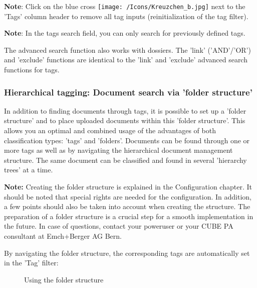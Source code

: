 \textbf{Note}: Click on the blue cross \texttt{[image: /Icons/Kreuzchen\_b.jpg]} next to the 'Tags' column header to remove all tag inputs (reinitialization of the tag filter).

\vspace{\baselineskip}

\textbf{Note}: In the tags search field, you can only search for previously defined tags.

\vspace{\baselineskip}

The advanced search function also works with dossiers. The 'link' ('AND'/'OR') and 'exclude' functions are identical to the 'link' and 'exclude' advanced search functions for tags.

\subsubsection{Hierarchical tagging: Document search via 'folder structure'}
\label{bkm:Ref201801849}

In addition to finding documents through tags, it is possible to set up a 'folder structure' and to place uploaded documents within this 'folder structure'. This allows you an optimal and combined usage of the advantages of both classification types: 'tags' and 'folders'. Documents can be found through one or more tags as well as by navigating the hierarchical document management structure. The same document can be classified and found in several 'hierarchy trees' at a time.

\vspace{\baselineskip}

\textbf{Note:} Creating the folder structure is explained in the Configuration chapter. It should be noted that special rights are needed for the configuration. In addition, a few points should also be taken into account when creating the structure. The preparation of a folder structure is a crucial step for a smooth implementation in the future. In case of questions, contact your poweruser or your CUBE PA consultant at Emch+Berger AG Bern.

\vspace{\baselineskip}

By navigating the folder structure, the corresponding tags are automatically set in the 'Tag' filter:

\begin{figure}[H]
\caption{Using the folder structure}
\end{figure}

